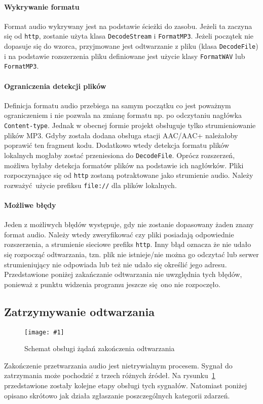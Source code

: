 \documentclass[12pt]{report}
\newcommand{\imgint}[4]{
	\begin{figure}[{#4}]
		\centering
		\texttt{[image: \#1]}
		\caption{#2}
		\label{#1}
	\end{figure}
}
\newcommand{\imgcs}[3]{\imgint{#1}{#2}{#3}{}}
\begin{document}
	\paragraph{Wykrywanie formatu}
		Format audio wykrywany jest na podstawie ścieżki do zasobu. Jeżeli ta zaczyna się od \lstinline|http|, zostanie użyta klasa \lstinline|DecodeStream| i \lstinline|FormatMP3|. Jeżeli początek nie dopasuje się do wzorca, przyjmowane jest odtwarzanie z pliku (klasa \lstinline|DecodeFile|) i na podstawie rozszerzenia pliku definiowane jest użycie klasy \lstinline|FormatWAV| lub \lstinline|FormatMP3|.
		
	\paragraph{Ograniczenia detekcji plików}
		Definicja formatu audio przebiega na samym początku co jest poważnym ograniczeniem i nie pozwala na zmianę formatu np. po odczytaniu nagłówka \lstinline|Content-type|. Jednak w obecnej formie projekt obsługuje tylko strumieniowanie plików MP3. Gdyby została dodana obsługa stacji AAC/AAC+ należałoby poprawić ten fragment kodu. Dodatkowo wtedy detekcja formatu plików lokalnych mogłaby zostać przeniesiona do \lstinline|DecodeFile|. Oprócz rozszerzeń, możliwa byłaby detekcja formatów plików na podstawie ich nagłówków. Pliki rozpoczynające się od \lstinline|http| zostaną potraktowane jako strumienie audio. Należy rozważyć użycie prefiksu \lstinline|file://| dla plików lokalnych.
	
	\paragraph{Możliwe błędy}
		Jeden z możliwych błędów występuje, gdy nie zostanie dopasowany żaden znany format audio. Należy wtedy zweryfikować czy pliki posiadają odpowiednie rozszerzenia, a strumienie sieciowe prefiks \lstinline|http|. Inny błąd oznacza że nie udało się rozpocząć odtwarzania, tzn. plik nie istnieje/nie można go odczytać lub serwer strumieniujący nie odpowiada lub też nie udało się określić jego adresu. Przedstawione poniżej zakańczanie odtwarzania nie uwzględnia tych błędów, ponieważ z punktu widzenia programu jeszcze się ono nie rozpoczęło.
	
	\subsection{Zatrzymywanie odtwarzania}
	\imgcs{3/PicoRadio-stop}{Schemat obsługi żądań zakończenia odtwarzania}{1}
	Zakończenie przetwarzania audio jest nietrywialnym procesem. Sygnał do zatrzymania może pochodzić z trzech różnych źródeł. Na rysunku~\ref{3/PicoRadio-stop} przedstawione zostały kolejne etapy obsługi tych sygnałów. Natomiast poniżej opisano skrótowo jak działa zgłaszanie poszczególnych kategorii zdarzeń. 
	$ $\\
	
\end{document}

